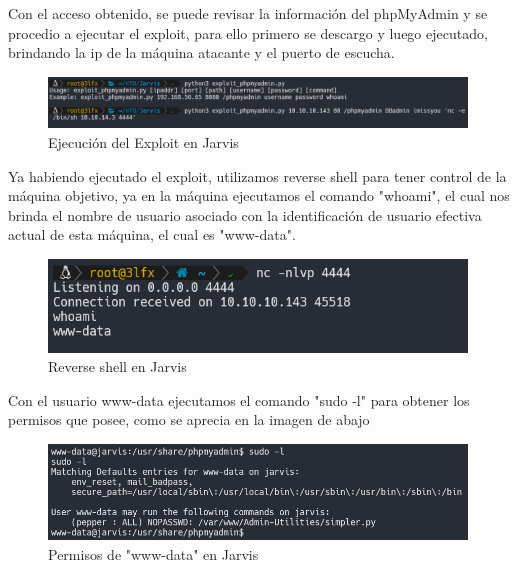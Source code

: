         \large{Con el acceso obtenido, se puede revisar la información del phpMyAdmin y se procedio a ejecutar el exploit, para ello primero se descargo y luego ejecutado, brindando la ip de la máquina atacante y el puerto de escucha.}
        \par
        \begin{figure}[H]
            \centering
            \includegraphics[width=0.99\textwidth]{imagenes/jarvis/11_exploit_phpmyadmin_jarvis.png}
            \caption{Ejecución del Exploit en Jarvis}
        \end{figure}

        \large{Ya habiendo ejecutado el exploit, utilizamos reverse shell para tener control de la máquina objetivo, ya en la máquina ejecutamos el comando "whoami", el cual nos brinda el nombre de usuario asociado con la identificación de usuario efectiva actual de esta máquina, el cual es "www-data".}
        \par
        \begin{figure}[H]
            \centering
            \includegraphics[width=0.99\textwidth]{imagenes/jarvis/12_reverse_shell_jarvis.png}
            \caption{Reverse shell en Jarvis}
        \end{figure}

        \large{Con el usuario www-data ejecutamos el comando "sudo -l" para obtener los permisos que posee, como se aprecia en la imagen de abajo}
        \par
        \begin{figure}[H]
            \centering
            \includegraphics[width=0.99\textwidth]{imagenes/jarvis/13_permiso_www_jarvis.png}
            \caption{Permisos de "www-data" en Jarvis}
        \end{figure}

